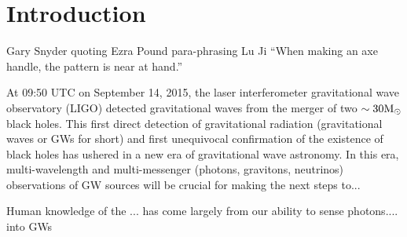 \chapter[Introduction]{Introduction} \label{ch:intro}







\vspace{-16pt} \begin{chapquote}{Gary Snyder quoting Ezra Pound para-phrasing Lu Ji} \singlespacing ``When making an axe handle, the pattern is near at hand.'' 
 \end{chapquote} \vspace{-8pt}
\noindent\makebox[\linewidth]{\rule{0.5\textwidth}{0.5pt}} \vspace{1pt}

At 09:50 UTC on September 14, 2015, the laser interferometer gravitational wave observatory (LIGO) detected gravitational waves from the merger of two $\sim 30 \mathrm{M}_\odot$ black holes. This first direct detection of gravitational radiation (gravitational waves or GWs for short) and first unequivocal confirmation of the existence of black holes has ushered in a new era of gravitational wave astronomy. In this era, multi-wavelength and multi-messenger (photons, gravitons, neutrinos) observations of GW sources will be crucial for making the next steps to...

Human knowledge of the ... has come largely from our ability to sense photons.... into GWs

